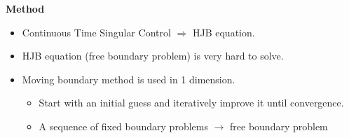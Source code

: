 \documentclass{beamer}
\begin{document}
%
\begin{frame}
{\bf Method}
\begin{itemize}
  \item Continuous Time Singular Control $\Rightarrow$ HJB equation.\\
  \item HJB equation (free boundary problem) is very hard to solve.\\
  \item Moving boundary method is used in 1 dimension.\\
  \begin{itemize}
  \item Start with an initial guess and iteratively improve it until convergence.\\
  \item A sequence of fixed boundary problems $\rightarrow$ free boundary problem\\
\end{itemize}
\end{itemize}
\end{frame}
%
\end{document}
